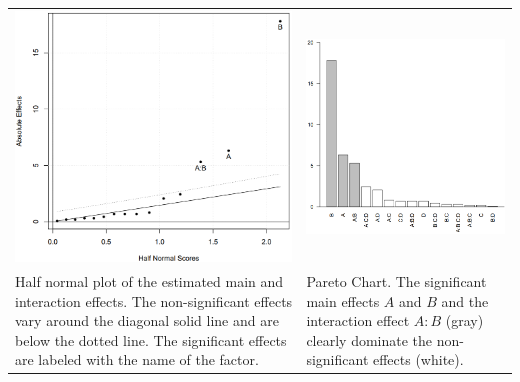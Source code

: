 \begin{table}[H]
  \setlength{\tabcolsep}{0.0em}
  \scriptsize
  \begin{tabular}{p{}@{\hskip 1em}p{}}
    \includegraphics[width=\linewidth]{Pics/14.1.2.png}& \includegraphics[width=\linewidth]{Pics/14.1.3.png} \\
    Half normal plot of the estimated main and interaction effects. The non-significant effects vary around the diagonal solid line and are below the dotted line. The significant effects are labeled with the name of the factor. &
    Pareto Chart. The significant main effects $A$ and $B$ and the interaction effect $A:B$ (gray) clearly dominate the non-significant effects (white).
  \end{tabular}
\end{table}

